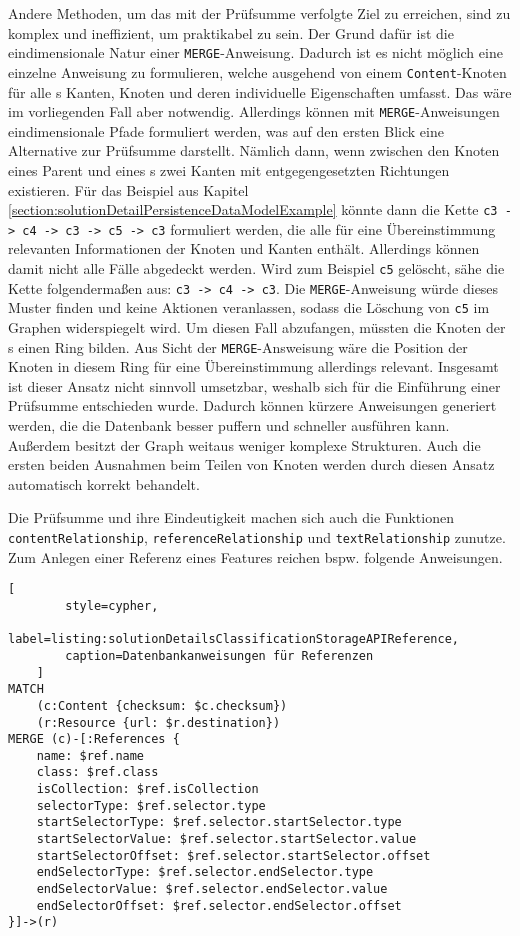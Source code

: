     Andere Methoden, um das mit der Prüfsumme verfolgte Ziel zu erreichen,
    sind zu komplex und ineffizient, um praktikabel zu sein.
    Der Grund dafür ist die eindimensionale Natur einer \texttt{MERGE}-Anweisung.
    Dadurch ist es nicht möglich eine einzelne Anweisung zu formulieren,
    welche ausgehend von einem \texttt{Content}-Knoten für alle {\childFeature}s
    Kanten, Knoten und deren individuelle Eigenschaften umfasst.
    Das wäre im vorliegenden Fall aber notwendig.
    Allerdings können mit \texttt{MERGE}-Anweisungen eindimensionale Pfade formuliert werden,
    was auf den ersten Blick eine Alternative zur Prüfsumme darstellt.
    Nämlich dann, wenn zwischen den Knoten eines Parent und eines {\childFeature}s
    zwei Kanten mit entgegengesetzten Richtungen existieren.
    Für das Beispiel aus Kapitel \ref{section:solutionDetailPersistenceDataModelExample} könnte dann
    die Kette \texttt{c3 -> c4 -> c3 -> c5 -> c3} formuliert werden,
    die alle für eine Übereinstimmung relevanten Informationen der Knoten und Kanten enthält.
    Allerdings können damit nicht alle Fälle abgedeckt werden.
    Wird zum Beispiel \texttt{c5} gelöscht, sähe die Kette folgendermaßen aus:
    \texttt{c3 -> c4 -> c3}.
    Die \texttt{MERGE}-Anweisung würde dieses Muster finden und keine Aktionen veranlassen,
    sodass die Löschung von \texttt{c5} im Graphen widerspiegelt wird.
    Um diesen Fall abzufangen, müssten die Knoten der {\childFeature}s einen Ring bilden.
    Aus Sicht der \texttt{MERGE}-Answeisung wäre die Position der Knoten in diesem Ring
    für eine Übereinstimmung allerdings relevant.
    Insgesamt ist dieser Ansatz nicht sinnvoll umsetzbar,
    weshalb sich für die Einführung einer Prüfsumme entschieden wurde.
    Dadurch können kürzere Anweisungen generiert werden, die die Datenbank besser puffern
    und schneller ausführen kann.
    Außerdem besitzt der Graph weitaus weniger komplexe Strukturen.
    Auch die ersten beiden Ausnahmen beim Teilen von Knoten werden durch diesen Ansatz
    automatisch korrekt behandelt.

    Die Prüfsumme und ihre Eindeutigkeit machen sich auch die Funktionen
    \texttt{contentRelationship}, \texttt{referenceRelationship} und \texttt{textRelationship} zunutze.
    Zum Anlegen einer Referenz eines Features reichen bspw. folgende Anweisungen.

\begin{lstlisting}[
        style=cypher,
        label=listing:solutionDetailsClassificationStorageAPIReference,
        caption=Datenbankanweisungen für Referenzen
    ]
MATCH
    (c:Content {checksum: $c.checksum})
    (r:Resource {url: $r.destination})
MERGE (c)-[:References {
    name: $ref.name
    class: $ref.class
    isCollection: $ref.isCollection
    selectorType: $ref.selector.type
    startSelectorType: $ref.selector.startSelector.type
    startSelectorValue: $ref.selector.startSelector.value
    startSelectorOffset: $ref.selector.startSelector.offset
    endSelectorType: $ref.selector.endSelector.type
    endSelectorValue: $ref.selector.endSelector.value
    endSelectorOffset: $ref.selector.endSelector.offset
}]->(r)
    \end{lstlisting}


